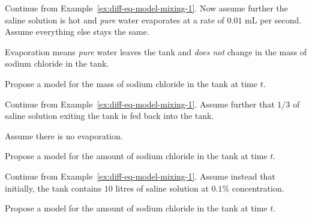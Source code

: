 \documentclass[../main.tex]{subfiles}
\begin{document}
\begin{example} \label{ex:diff-eq-model-mixing-2}
  Continue from Example~\ref{ex:diff-eq-model-mixing-1}. Now assume further the saline solution is hot and \emph{pure} water evaporates at a rate of \(0.01\) mL per second.  Assume everything else stays the same.

  Evaporation means \emph{pure} water leaves the tank and \emph{does not} change in the mass of sodium chloride in the tank.

  Propose a model for the mass of sodium chloride in the tank at time \(t\). 
\end{example}
\clearpage

\begin{example} \label{ex:diff-eq-model-mixing-2}
  Continue from Example~\ref{ex:diff-eq-model-mixing-1}. Assume further that \(1/3\) of saline solution exiting the tank is fed back into the tank. 

  Assume there is no evaporation.

  Propose a model for the amount of sodium chloride in the tank at time \(t\). 
\end{example}
\clearpage

\begin{example}
  Continue from Example~\ref{ex:diff-eq-model-mixing-1}. Assume instead that initially, the tank contains \(10\) litres of saline solution at \(0.1\%\) concentration.

  Propose a model for the amount of sodium chloride in the tank at time \(t\). 
\end{example}
\end{document}

